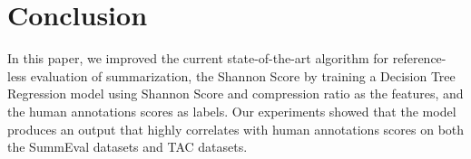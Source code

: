 \section{Conclusion}

In this paper, we improved the current state-of-the-art algorithm for reference-less evaluation of summarization, the Shannon Score by training a Decision Tree Regression model using Shannon Score and compression ratio as the features, and the human annotations scores as labels. Our experiments showed that the model produces an output that highly correlates with human annotations scores on both the SummEval datasets and TAC datasets.